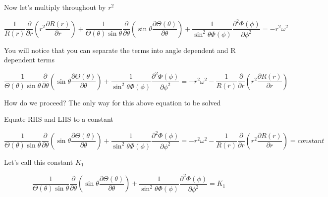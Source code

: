 \documentclass[12pt]{article}
\renewcommand{\_}{\kern-1.5pt\textunderscore\kern-1.5pt}
\begin{document}
Now let’s multiply throughout by  \( r^{2} \) \par

 \[ \frac{1}{R \left( r \right) }\frac{ \partial }{ \partial r} \left( r^{2}\frac{ \partial R \left( r \right) }{ \partial r} \right) +\frac{1}{ \Theta  \left(  \theta  \right) \sin  \theta }\frac{ \partial }{ \partial  \theta } \left( \sin  \theta \frac{ \partial  \Theta  \left(  \theta  \right) }{ \partial  \theta } \right) +\frac{1}{\sin ^{2} \theta  \Phi  \left(  \phi  \right) }\frac{ \partial ^{2} \Phi  \left(  \phi  \right) }{ \partial  \phi ^{2}}=-r^{2} \omega ^{2} \] \par

You will notice that you can separate the terms into angle dependent and R dependent terms\par

 \[ \frac{1}{ \Theta  \left(  \theta  \right) \sin  \theta }\frac{ \partial }{ \partial  \theta } \left( \sin  \theta \frac{ \partial  \Theta  \left(  \theta  \right) }{ \partial  \theta } \right) +\frac{1}{\sin ^{2} \theta  \Phi  \left(  \phi  \right) }\frac{ \partial ^{2} \Phi  \left(  \phi  \right) }{ \partial  \phi ^{2}}=-r^{2} \omega ^{2}-\frac{1}{R \left( r \right) }\frac{ \partial }{ \partial r} \left( r^{2}\frac{ \partial R \left( r \right) }{ \partial r} \right)  \] \par

How do we proceed? The only way for this above equation to be solved\par

Equate RHS and LHS to a constant\par

 \[ \frac{1}{ \Theta  \left(  \theta  \right) \sin  \theta }\frac{ \partial }{ \partial  \theta } \left( \sin  \theta \frac{ \partial  \Theta  \left(  \theta  \right) }{ \partial  \theta } \right) +\frac{1}{\sin ^{2} \theta  \Phi  \left(  \phi  \right) }\frac{ \partial ^{2} \Phi  \left(  \phi  \right) }{ \partial  \phi ^{2}}=-r^{2} \omega ^{2}-\frac{1}{R \left( r \right) }\frac{ \partial }{ \partial r} \left( r^{2}\frac{ \partial R \left( r \right) }{ \partial r} \right) =constant \] \par

Let’s call this constant  \( K_{1} \) \par

 \[ \frac{1}{ \Theta  \left(  \theta  \right) \sin  \theta }\frac{ \partial }{ \partial  \theta } \left( \sin  \theta \frac{ \partial  \Theta  \left(  \theta  \right) }{ \partial  \theta } \right) +\frac{1}{\sin ^{2} \theta  \Phi  \left(  \phi  \right) }\frac{ \partial ^{2} \Phi  \left(  \phi  \right) }{ \partial  \phi ^{2}}=K_{1} \] \par
\end{document}
